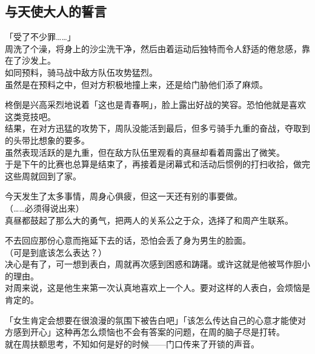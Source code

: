 \subsection{与天使大人的誓言}

「受了不少罪……」\\

周洗了个澡，将身上的沙尘洗干净，然后由着运动后独特而令人舒适的倦怠感，靠在了沙发上。\\

如同预料，骑马战中敌方队伍攻势猛烈。\\

虽然是在预料之中，但对方积极地撞上来，还是给门胁他们添了麻烦。

柊倒是兴高采烈地说着「这也是青春啊」，脸上露出好战的笑容。恐怕他就是喜欢这类竞技吧。\\

结果，在对方迅猛的攻势下，周队没能活到最后，但多亏骑手九重的奋战，夺取到的头带比想象的要多。\\

虽然表现活跃的是九重，但在敌方队伍里观看的真昼却看着周露出了微笑。\\

于是下午的比赛也总算是结束了，再接着是闭幕式和活动后惯例的打扫收拾，做完这些周就回到了家。

今天发生了太多事情，周身心俱疲，但这一天还有别的事要做。\\

（……必须得说出来）\\

真昼都鼓起了那么大的勇气，把两人的关系公之于众，选择了和周产生联系。

不去回应那份心意而拖延下去的话，恐怕会丢了身为男生的脸面。\\

（可是到底该怎么表达？）\\

决心是有了，可一想到表白，周就再次感到困惑和踌躇。或许这就是他被骂作胆小的理由。\\

对周来说，这是他生来第一次认真地喜欢上一个人。要对这样的人表白，会烦恼是肯定的。

「女生肯定会想要在很浪漫的氛围下被告白吧」「该怎么传达自己的心意才能使对方感到开心」这种再怎么烦恼也不会有答案的问题，在周的脑子尽是打转。\\

就在周扶额思考，不知如何是好的时候——门口传来了开锁的声音。\\

